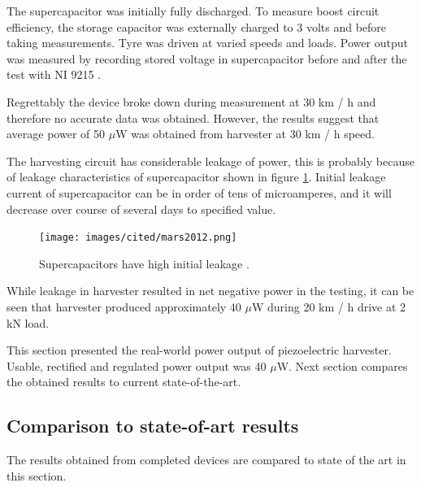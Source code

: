 The supercapacitor was initially fully discharged. To measure boost circuit efficiency, the storage capacitor was externally charged to 3 volts and before taking measurements. Tyre was driven at varied speeds and loads. Power output was measured by recording stored voltage in supercapacitor before and after the test with NI 9215 \cite{ni9215}.

\begin{table}[htb]
\caption{\label{tbl:piezo_harvester_tyre_output} Measured values from tyre test setup.}
\begin{center}
\end{center}
\end{table}

Regrettably the device broke down during measurement at 30 km / h and therefore no accurate data was obtained. However, the results suggest that average power of 50 $\mu$W was obtained from harvester at 30 km / h speed.

The harvesting circuit has considerable leakage of power, this is probably because of leakage characteristics of supercapacitor shown in figure \ref{fig:scap_leakage}. Initial leakage current of supercapacitor can be in order of tens of microamperes, and it will decrease over course of several days to specified value.

\begin{figure}[htb]
\begin{center}
\texttt{[image: images/cited/mars2012.png]}
\end{center}
\caption{\label{fig:scap_leakage} Supercapacitors have high initial leakage \cite{Mars2012}.}
\end{figure}

While leakage in harvester resulted in net negative power in the testing, it can be seen that harvester produced approximately 40 $\mu$W during 20 km / h drive at 2 kN load.

This section presented the real-world power output of piezoelectric harvester. Usable, rectified and regulated power output was 40 $\mu$W. Next section compares the obtained results to current state-of-the-art.

\subsection{Comparison to state-of-art results}
The results obtained from completed devices are compared to state of the art in this section.

